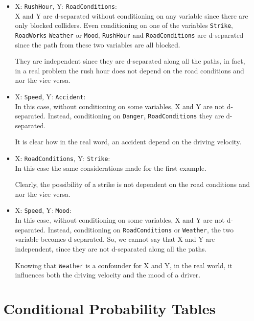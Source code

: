\documentclass[a4paper,12pt]{article} %
\begin{document}
\begin{itemize}
	\item X: \texttt{RushHour}, Y: \texttt{RoadConditions}:\\
	X and Y are d-separated without conditioning on any variable since there are only blocked colliders. Even conditioning on one of the variables \texttt{Strike}, \texttt{RoadWorks} \texttt{Weather} or \texttt{Mood}, \texttt{RushHour} and \texttt{RoadConditions} are d-separated since the path from these two variables are all blocked.
	
	They are independent since they are d-separated along all the paths, in fact, in a real problem the rush hour does not depend on the road conditions and nor the vice-versa. 
	
	\item X: \texttt{Speed}, Y: \texttt{Accident}:\\
	In this case, without conditioning on some variables, X and Y are not d-separated. Instead, conditioning on \texttt{Danger}, \texttt{RoadConditions} they are d-separated. 
	
	It is clear how in the real word, an accident depend on the driving velocity.  
	
	\item X: \texttt{RoadConditions}, Y: \texttt{Strike}:\\
	In this case the same considerations made for the first example. 
	
	Clearly, the possibility of a strike is not dependent on the road conditions and nor the vice-versa. 
	
	\item X: \texttt{Speed}, Y: \texttt{Mood}:\\
	In this case, without conditioning on some variables, X and Y are not d-separated. Instead, conditioning on \texttt{RoadConditions} or \texttt{Weather}, the two variable becomes d-separated.
	So, we cannot say that X and Y are independent, since they are not d-separated along all the paths.
	
	Knowing that \texttt{Weather} is a confounder for X and Y, in the real world, it influences both the driving velocity and the mood of a driver.

\end{itemize}

\section{Conditional Probability Tables}
\end{document}
